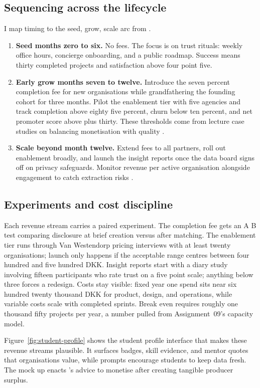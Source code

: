 \subsection*{Sequencing across the lifecycle}
I map timing to the seed, grow, scale arc from \citet{Choudary2016}.
\begin{enumerate}
  \item \textbf{Seed months zero to six.} No fees. The focus is on trust rituals: weekly office hours, concierge onboarding, and a public roadmap. Success means thirty completed projects and satisfaction above four point five.
  \item \textbf{Early grow months seven to twelve.} Introduce the seven percent completion fee for new organisations while grandfathering the founding cohort for three months. Pilot the enablement tier with five agencies and track completion above eighty five percent, churn below ten percent, and net promoter score above plus thirty. These thresholds come from lecture case studies on balancing monetisation with quality \citep{Lecture05}.
  \item \textbf{Scale beyond month twelve.} Extend fees to all partners, roll out enablement broadly, and launch the insight reports once the data board signs off on privacy safeguards. Monitor revenue per active organisation alongside engagement to catch extraction risks \citep{Srnicek2017}.
\end{enumerate}

\subsection*{Experiments and cost discipline}
Each revenue stream carries a paired experiment. The completion fee gets an A B test comparing disclosure at brief creation versus after matching. The enablement tier runs through Van Westendorp pricing interviews with at least twenty organisations; launch only happens if the acceptable range centres between four hundred and five hundred DKK. Insight reports start with a diary study involving fifteen participants who rate trust on a five point scale; anything below three forces a redesign. Costs stay visible: fixed year one spend sits near six hundred twenty thousand DKK for product, design, and operations, while variable costs scale with completed sprints. Break even requires roughly one thousand fifty projects per year, a number pulled from Assignment~09's capacity model.

Figure~\ref{fig:student-profile} shows the student profile interface that makes these revenue streams plausible. It surfaces badges, skill evidence, and mentor quotes that organisations value, while prompts encourage students to keep data fresh. The mock up enacts \citet{Choudary2016}'s advice to monetise after creating tangible producer surplus.

